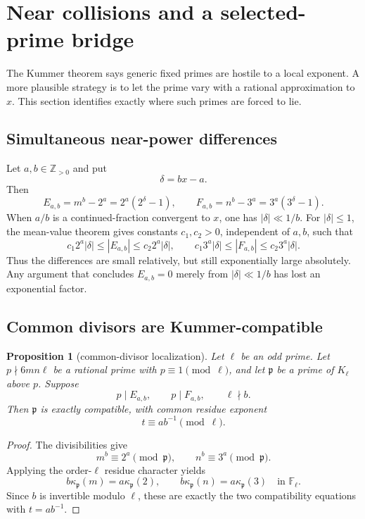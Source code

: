 \documentclass[11pt,oneside]{article}
\newtheorem{proposition}[theorem]{Proposition}
\theoremstyle{definition}
\theoremstyle{remark}
\newcommand{\Z}{\mathbb{Z}}
\newcommand{\F}{\mathbb{F}}
\begin{document}
\section{Near collisions and a selected-prime bridge}\label{sec:selected-prime}

The Kummer theorem says generic fixed primes are hostile to a local exponent.
A more plausible strategy is to let the prime vary with a rational
approximation to $x$.  This section identifies exactly where such primes are
forced to lie.

\subsection{Simultaneous near-power differences}

Let $a,b\in\Z_{>0}$ and put
\[
 \delta=bx-a.
\]
Then
\begin{equation}\label{eq:near-differences}
 E_{a,b}=m^b-2^a=2^a(2^\delta-1),\qquad
 F_{a,b}=n^b-3^a=3^a(3^\delta-1).
\end{equation}
When $a/b$ is a continued-fraction convergent to $x$, one has
$|\delta|\ll1/b$.  For $|\delta|\le1$, the mean-value theorem gives constants
$c_1,c_2>0$, independent of $a,b$, such that
\begin{equation}\label{eq:near-bounds}
 c_1 2^a|\delta|\le |E_{a,b}|\le c_2 2^a|\delta|,
 \qquad
 c_1 3^a|\delta|\le |F_{a,b}|\le c_2 3^a|\delta|.
\end{equation}
Thus the differences are small relatively, but still exponentially large
absolutely.  Any argument that concludes $E_{a,b}=0$ merely from
$|\delta|\ll1/b$ has lost an exponential factor.

\subsection{Common divisors are Kummer-compatible}

\begin{proposition}[common-divisor localization]\label{prop:gcd-localization}
Let $\ell$ be an odd prime.  Let $p\nmid6mn\ell$ be a rational prime with
$p\equiv1\pmod\ell$, and let $\mathfrak p$ be a prime of $K_\ell$ above $p$.
Suppose
\[
 p\mid E_{a,b},\qquad p\mid F_{a,b},\qquad \ell\nmid b.
\]
Then $\mathfrak p$ is exactly compatible, with common residue exponent
\[
 t\equiv a b^{-1}\pmod\ell.
\]
\end{proposition}

\begin{proof}
The divisibilities give
\[
 m^b\equiv2^a\pmod{\mathfrak p},\qquad
 n^b\equiv3^a\pmod{\mathfrak p}.
\]
Applying the order-$\ell$ residue character yields
\[
 b\kappa_{\mathfrak p}(m)=a\kappa_{\mathfrak p}(2),\qquad
 b\kappa_{\mathfrak p}(n)=a\kappa_{\mathfrak p}(3)
 \quad\text{in }\F_\ell.
\]
Since $b$ is invertible modulo $\ell$, these are exactly the two compatibility
equations with $t=ab^{-1}$.
\end{proof}
\end{document}
